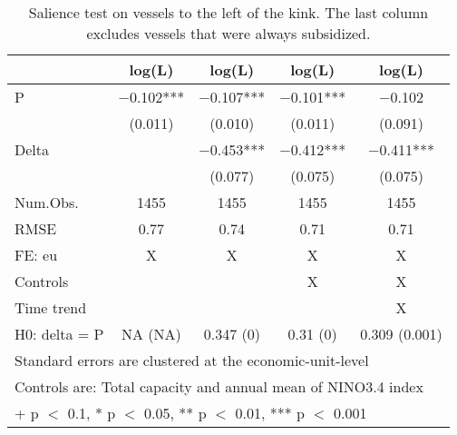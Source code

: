 \begin{table}

\caption{\label{tab:}Salience test on vessels to the left of the kink.
             The last column excludes vessels that were always subsidized.}
\centering
\begin{tabular}[t]{lcccc}
\toprule
  & log(L) & log(L)  & log(L)   & log(L)   \\
\midrule
P & \num{-0.102}*** & \num{-0.107}*** & \num{-0.101}*** & \num{-0.102}\\
 & (\num{0.011}) & (\num{0.010}) & (\num{0.011}) & (\num{0.091})\\
Delta &  & \num{-0.453}*** & \num{-0.412}*** & \num{-0.411}***\\
 &  & (\num{0.077}) & (\num{0.075}) & (\num{0.075})\\
\midrule
Num.Obs. & \num{1455} & \num{1455} & \num{1455} & \num{1455}\\
RMSE & \num{0.77} & \num{0.74} & \num{0.71} & \num{0.71}\\
FE: eu & X & X & X & X\\
Controls &  &  & X & X\\
Time trend &  &  &  & X\\
H0: delta = P & NA (NA) & 0.347 (0) & 0.31 (0) & 0.309 (0.001)\\
\bottomrule
\multicolumn{5}{l}{\rule{0pt}{1em}Standard errors are clustered at the economic-unit-level}\\
\multicolumn{5}{l}{\rule{0pt}{1em}Controls are: Total capacity and annual mean of NINO3.4 index}\\
\multicolumn{5}{l}{\rule{0pt}{1em}+ p $<$ 0.1, * p $<$ 0.05, ** p $<$ 0.01, *** p $<$ 0.001}\\
\end{tabular}
\end{table}
